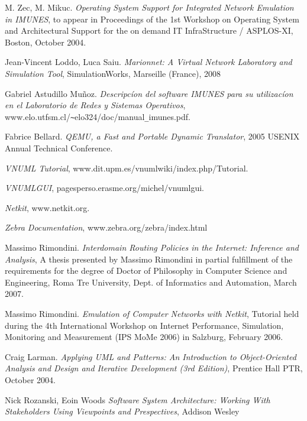 \clearpage
\begin{thebibliography}{9}
	M. Zec, M. Mikuc.
	\emph{Operating System Support for Integrated Network Emulation in IMUNES}, to appear in Proceedings of the 1st Workshop on Operating System and Architectural Support for the on demand IT InfraStructure / ASPLOS-XI, Boston, October 2004.

	Jean-Vincent Loddo, Luca Saiu.
	\emph{Marionnet: A Virtual Network Laboratory and Simulation Tool}, SimulationWorks, Marseille (France), 2008

	Gabriel Astudillo Mu\~{n}oz.
	\emph{Descripcíon del software IMUNES para su utilizacíon en el Laboratorio de Redes y Sistemas Operativos}, www.elo.utfsm.cl/\verb+~+elo324/doc/manual\verb+_+imunes.pdf.

	Fabrice Bellard.
	\emph{QEMU, a Fast and Portable Dynamic Translator}, 2005 USENIX Annual Technical Conference.

	\emph{VNUML Tutorial}, www.dit.upm.es/vnumlwiki/index.php/Tutorial.

	\emph{VNUMLGUI}, pagesperso.erasme.org/michel/vnumlgui.

	\emph{Netkit}, www.netkit.org.

	\emph{Zebra Documentation}, www.zebra.org/zebra/index.html

	Massimo Rimondini.
	\emph{Interdomain Routing Policies in the Internet: Inference and Analysis}, A thesis presented by Massimo Rimondini in partial fulfillment of the requirements for the degree of Doctor of Philosophy in Computer Science and Engineering, Roma Tre University, Dept. of Informatics and Automation, March 2007.

	Massimo Rimondini.
	\emph{Emulation of Computer Networks with Netkit}, Tutorial held during the 4th International Workshop on Internet Performance, Simulation, Monitoring and Measurement (IPS MoMe 2006) in Salzburg, February 2006.

	Craig Larman.
	\emph{Applying UML and Patterns: An Introduction to Object-Oriented Analysis and Design and Iterative Development (3rd Edition)}, Prentice Hall PTR, October 2004.

	Nick Rozanski, Eoin Woods
	\emph{Software System Architecture: Working With Stakeholders Using Viewpoints and Prespectives}, Addison Wesley

\end{thebibliography}
